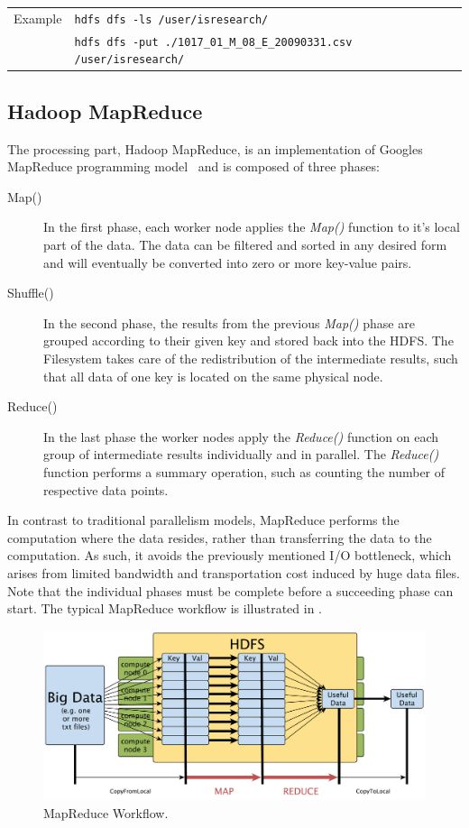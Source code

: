 \begin{tabular}[t]{ll}
Example & \texttt{hdfs dfs -ls /user/isresearch/}\\
 & \texttt{hdfs dfs -put ./1017\_01\_M\_08\_E\_20090331.csv /user/isresearch/}\\
\end{tabular}
\vspace{0.1cm}


\subsection{Hadoop MapReduce}
The processing part, Hadoop MapReduce, is an implementation of Googles MapReduce programming model~\cite{googleMapReduce} and is  composed of three phases:
\begin{description}
\item[Map()] In the first phase, each worker node applies the \emph{Map()} function to it's local part of the data. The data can be filtered and sorted in any desired form and will eventually be converted into zero or more key-value pairs.

\item[Shuffle()] In the second phase, the results from the previous \emph{Map()} phase are grouped according to their given key and stored back into the \ac{HDFS}. The Filesystem takes care of the redistribution of the intermediate results, such that all data of one key is located on the same physical node.

\item[Reduce()] In the last phase the worker nodes apply the \emph{Reduce()} function on each group of intermediate results individually and in parallel. The \emph{Reduce()} function performs a summary operation, such as counting the number of respective data points.
\end{description}

In contrast to traditional parallelism models, MapReduce performs the computation where the data resides, rather than transferring the data to the computation. As such, it avoids the previously mentioned I/O bottleneck, which arises from limited bandwidth and transportation cost induced by huge data files. Note that the individual phases must be complete before a succeeding phase can start. The typical MapReduce workflow is illustrated in .

\begin{figure}[ht]
\centering
\includegraphics[width=0.70\linewidth]{content/drawings/MapReduceWorkflow}

\caption{MapReduce Workflow.}
\footnotesize 
\label{fig:mapreduceWorkflow}
\end{figure}


